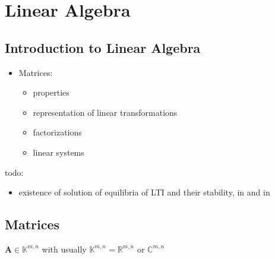 \documentclass[letterpaper,10pt,english]{jupyterBook}
\begin{document}
\sphinxstepscope


\part{Linear Algebra}

\sphinxstepscope


\chapter{Introduction to Linear Algebra}
\label{\detokenize{ch/linear-algebra/intro:introduction-to-linear-algebra}}\label{\detokenize{ch/linear-algebra/intro:math-linear-algebra-intro}}\label{\detokenize{ch/linear-algebra/intro::doc}}\begin{itemize}
\item {} 
\sphinxAtStartPar
Matrices:
\begin{itemize}
\item {} 
\sphinxAtStartPar
properties

\item {} 
\sphinxAtStartPar
representation of linear transformations

\item {} 
\sphinxAtStartPar
factorizations

\item {} 
\sphinxAtStartPar
linear systems

\end{itemize}

\end{itemize}

\sphinxAtStartPar
todo:
\begin{itemize}
\item {} 
\sphinxAtStartPar
existence of solution of equilibria of LTI and their stability, in {\hyperref[\detokenize{ch/system-theory/lti-response:ode-lti-response-equilibria}]{}} and in {\hyperref[\detokenize{ch/system-theory/lti-response:ode-lti-response-stability}]{}}

\end{itemize}

\sphinxstepscope


\chapter{Matrices}
\label{\detokenize{ch/linear-algebra/matrices:matrices}}\label{\detokenize{ch/linear-algebra/matrices:math-linear-algebra-matrix}}\label{\detokenize{ch/linear-algebra/matrices::doc}}
\sphinxAtStartPar
\(\mathbf{A} \in \mathbb{K}^{m,n} \) with usually \(\mathbb{K}^{m,n} = \mathbb{R}^{m,n}\) or \(\mathbb{C}^{m,n}\)
\end{document}

